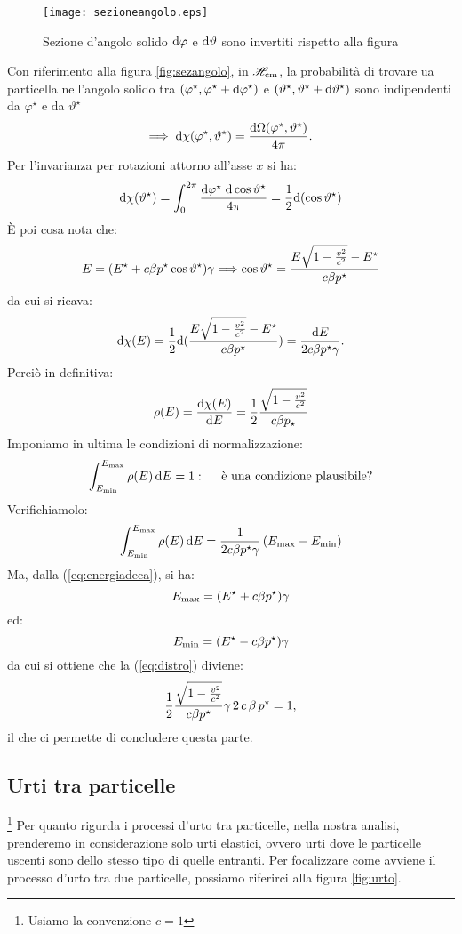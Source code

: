 \begin{figure}[htbp]
\begin{center}
\texttt{[image: sezioneangolo.eps]}
\caption{Sezione d'angolo solido \(\mathrm{d} \varphi\) e \(\mathrm{d} \vartheta\)
 sono invertiti rispetto alla figura} \label{fig:sezangolo}
\end{center}
\end{figure}

Con riferimento alla figura \vref{fig:sezangolo}, in $\mathscr{H}_{\mathrm{cm}}$, la
probabilit\`a di trovare ua particella nell'angolo solido tra
$(\varphi^{\star},\varphi^{\star}+\mathrm{d} \varphi^{\star})$ e
$(\vartheta^{\star},\vartheta^{\star}+\mathrm{d} \vartheta^{\star})$ sono
indipendenti da $\varphi^{\star}$ e da $\vartheta^{\star}$
$$
\Longrightarrow \; \mathrm{d} \chi
(\varphi^{\star},\vartheta^{\star})=\frac{\mathrm{d}
\Omega(\varphi^{\star},\vartheta^{\star})}{4 \pi}.
$$
Per l'invarianza per rotazioni attorno all'asse $x$ si ha:
$$
\mathrm{d} \chi (\vartheta^{\star})=\int_{0}^{2 \pi}\frac{\mathrm{d}
\varphi^{\star} \;\mathrm{d} \cos \vartheta^{\star}}{4 \pi}=\frac{1}{2}
\mathrm{d} (\cos \vartheta^{\star})
$$
\`E poi cosa nota che:
\begin{equation}
E=(E^{\star}+c\beta p^{\star}\cos\vartheta^{\star})\gamma
\Longrightarrow \cos\vartheta^{\star}=\frac{E \sqrt{1-\frac{v^{2}}{c^{2}}}
-E^{\star}}{c\beta p^{\star}} \label{eq:energiadeca}\end{equation}
da cui si ricava:
$$
\mathrm{d} \chi (E)=\frac{1}{2} \mathrm{d} (\frac{E \sqrt{1-\frac{v^{2}}{c^{2}}} -E^{\star}}{c\beta
p^{\star}})=\frac{\mathrm{d} E}{2 c \beta p^{\star}\gamma}.
$$
Perci\`o in definitiva:
$$
\rho (E)=\frac{\mathrm{d} \chi (E)}{\mathrm{d} E}=\frac{1}{2}\frac{\sqrt{1-\frac{v^{2}}{c^{2}}}}{c \beta
p_{\star}}
$$
Imponiamo in ultima le condizioni di normalizzazione:
$$
\int_{E_{\mathrm{min}}}^{E_{\mathrm{max}}} \rho (E)\,\mathrm{d} E=1:
\quad\mbox{ \`e una condizione plausibile?}
$$
Verifichiamolo:
\begin{equation}
\int_{E_{\mathrm{min}}}^{E_{\mathrm{max}}} \rho (E)\,\mathrm{d} E = \frac{1}{2 c
 \beta  p^{\star}\gamma}\,(E_{\mathrm{max}}-E_{\mathrm{min}})
\label{eq:distro}
\end{equation}
Ma, dalla (\ref{eq:energiadeca}), si ha:
$$
E_{\mathrm{max}}=(E^{\star}+c\beta p^{\star})\gamma
$$
ed:
$$
E_{\mathrm{min}}=(E^{\star}-c\beta p^{\star})\gamma
$$
da cui si ottiene che la (\ref{eq:distro}) diviene:
$$
\frac{1}{2}\frac{\sqrt{1-\frac{v^{2}}{c^{2}}}}{c\beta p^{\star}}\gamma \,2 \,c \,\beta\,
p^{\star}=1,
$$
il che ci permette di concludere questa parte.
\subsection{ Urti tra particelle}
\footnote{ Usiamo la convenzione $c=1$} Per quanto rigurda i
processi d'urto tra particelle, nella nostra analisi, prenderemo
in considerazione solo urti elastici, ovvero urti dove le
particelle uscenti sono dello stesso tipo di quelle entranti. Per
focalizzare come avviene il processo d'urto tra due particelle,
possiamo riferirci alla figura \vref{fig:urto}.

